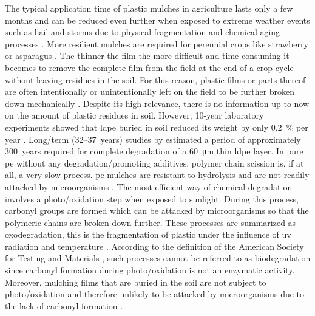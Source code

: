 The typical application time of plastic mulches in agriculture lasts only a few months and can be reduced even further when exposed to extreme weather events such as hail and storms due to physical fragmentation and chemical aging processes \citep{Scarascia-MugnozzaPlastic2011}. More resilient mulches are required for perennial crops like strawberry or asparagus \citep{HablotEffect2014}. The thinner the film the more difficult and time consuming it becomes to remove the complete film from the field at the end of a crop cycle without leaving residues in the soil. For this reason, plastic films or parts thereof are often intentionally or unintentionally left on the field to be further broken down mechanically \citep{MorenoImage2014}.
Despite its high relevance, there is no information up to now on the amount of plastic residues in soil. However, \num{10}-year laboratory experiments showed that \ac{ldpe} buried in soil reduced its weight by only \SI{0.2}{\percent} per year \citep{AlbertssonMechanism1987}. Long\-/term (\numrange{32}{37}~years) studies by \citet{OhtakeStudies1998} estimated a period of approximately \num{300}~years required for complete degradation of a \SI{60}{\micro\meter} thin \ac{ldpe} layer. In pure \ac{pe} without any degradation\-/promoting additives, polymer chain scission is, if at all, a very slow process. \ac{pe} mulches are resistant to hydrolysis and are not readily attacked by microorganisms \citep{StevensGreen2002}. The most efficient way of chemical degradation involves a photo\-/oxidation step when exposed to sunlight. During this process, carbonyl groups are formed which can be attacked by microorganisms so that the polymeric chains are broken down further. These processes are summarized as oxodegradation, this is the fragmentation of plastic under the influence of \ac{uv} radiation and temperature \citep{SivanNew2011}. According to the definition of the American Society for Testing and Materials \citep{ASTMD5488-94Terminology1994}, such processes cannot be referred to as biodegradation since carbonyl formation during photo\-/oxidation is not an enzymatic activity. Moreover, mulching films that are buried in the soil are not subject to photo\-/oxidation and therefore unlikely to be attacked by microorganisms due to the lack of carbonyl formation \citep{MorenoImage2014}.

